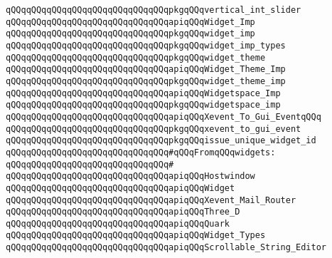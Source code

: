 \verb|qQQqqQQqqQQqqQQqqQQqqQQqqQQqqQQqpkgqQQqvertical_int_slider|\newline
\newline
\verb|qQQqqQQqqQQqqQQqqQQqqQQqqQQqqQQqapiqQQqWidget_Imp|\newline
\verb|qQQqqQQqqQQqqQQqqQQqqQQqqQQqqQQqpkgqQQqwidget_imp|\newline
\newline
\verb|qQQqqQQqqQQqqQQqqQQqqQQqqQQqqQQqpkgqQQqwidget_imp_types|\newline
\verb|qQQqqQQqqQQqqQQqqQQqqQQqqQQqqQQqpkgqQQqwidget_theme|\newline
\newline
\verb|qQQqqQQqqQQqqQQqqQQqqQQqqQQqqQQqapiqQQqWidget_Theme_Imp|\newline
\verb|qQQqqQQqqQQqqQQqqQQqqQQqqQQqqQQqpkgqQQqwidget_theme_imp|\newline
\newline
\verb|qQQqqQQqqQQqqQQqqQQqqQQqqQQqqQQqapiqQQqWidgetspace_Imp|\newline
\verb|qQQqqQQqqQQqqQQqqQQqqQQqqQQqqQQqpkgqQQqwidgetspace_imp|\newline
\newline
\verb|qQQqqQQqqQQqqQQqqQQqqQQqqQQqqQQqapiqQQqXevent_To_Gui_EventqQQq|\newline
\verb|qQQqqQQqqQQqqQQqqQQqqQQqqQQqqQQqpkgqQQqxevent_to_gui_event|\newline
\newline
\verb|qQQqqQQqqQQqqQQqqQQqqQQqqQQqqQQqpkgqQQqissue_unique_widget_id|\newline
\newline
\newline
\verb|qQQqqQQqqQQqqQQqqQQqqQQqqQQqqQQq#qQQqFromqQQqwidgets:|\newline
\verb|qQQqqQQqqQQqqQQqqQQqqQQqqQQqqQQq#|\newline
\verb|qQQqqQQqqQQqqQQqqQQqqQQqqQQqqQQqapiqQQqHostwindow|\newline
\verb|qQQqqQQqqQQqqQQqqQQqqQQqqQQqqQQqapiqQQqWidget|\newline
\verb|qQQqqQQqqQQqqQQqqQQqqQQqqQQqqQQqapiqQQqXevent_Mail_Router|\newline
\verb|qQQqqQQqqQQqqQQqqQQqqQQqqQQqqQQqapiqQQqThree_D|\newline
\verb|qQQqqQQqqQQqqQQqqQQqqQQqqQQqqQQqapiqQQqQuark|\newline
\verb|qQQqqQQqqQQqqQQqqQQqqQQqqQQqqQQqapiqQQqWidget_Types|\newline
\verb|qQQqqQQqqQQqqQQqqQQqqQQqqQQqqQQqapiqQQqScrollable_String_Editor|\newline
